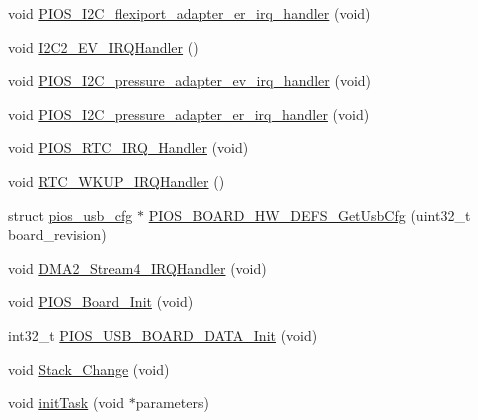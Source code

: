 \begin{DoxyCompactItemize}
\item 
void \hyperlink{group___revo_mini_ga7ae5d4453562364b12d1a9a55c2c9717}{\-P\-I\-O\-S\-\_\-\-I2\-C\-\_\-flexiport\-\_\-adapter\-\_\-er\-\_\-irq\-\_\-handler} (void)
\item 
void \hyperlink{group___revo_mini_gaa32a80208798d6132876a58823ff6202}{\-I2\-C2\-\_\-\-E\-V\-\_\-\-I\-R\-Q\-Handler} ()
\item 
void \hyperlink{group___revo_mini_ga7e50e4f3e62dd5e68d7d45ec01d1c367}{\-P\-I\-O\-S\-\_\-\-I2\-C\-\_\-pressure\-\_\-adapter\-\_\-ev\-\_\-irq\-\_\-handler} (void)
\item 
void \hyperlink{group___revo_mini_gac7417688efc77b991f77ec10f190e83e}{\-P\-I\-O\-S\-\_\-\-I2\-C\-\_\-pressure\-\_\-adapter\-\_\-er\-\_\-irq\-\_\-handler} (void)
\item 
void \hyperlink{group___revo_mini_gadc73bf2eccd9d9ff9d8efedd1e743704}{\-P\-I\-O\-S\-\_\-\-R\-T\-C\-\_\-\-I\-R\-Q\-\_\-\-Handler} (void)
\item 
void \hyperlink{group___revo_mini_ga7e78266985c97f3b7e8a9f91893657d1}{\-R\-T\-C\-\_\-\-W\-K\-U\-P\-\_\-\-I\-R\-Q\-Handler} ()
\item 
struct \hyperlink{structpios__usb__cfg}{pios\-\_\-usb\-\_\-cfg} $\ast$ \hyperlink{group___revo_mini_ga9075152ece4596f99329ba0bc3866dc9}{\-P\-I\-O\-S\-\_\-\-B\-O\-A\-R\-D\-\_\-\-H\-W\-\_\-\-D\-E\-F\-S\-\_\-\-Get\-Usb\-Cfg} (uint32\-\_\-t board\-\_\-revision)
\item 
void \hyperlink{group___revo_mini_ga295198ed574625d416158a5fc54205ea}{\-D\-M\-A2\-\_\-\-Stream4\-\_\-\-I\-R\-Q\-Handler} (void)
\item 
void \hyperlink{group___revo_mini_ga902009c5b1cb57d9f9d60092eb7cacfb}{\-P\-I\-O\-S\-\_\-\-Board\-\_\-\-Init} (void)
\item 
int32\-\_\-t \hyperlink{group___revo_mini_ga5efd94ab761f254827f38dba474cf642}{\-P\-I\-O\-S\-\_\-\-U\-S\-B\-\_\-\-B\-O\-A\-R\-D\-\_\-\-D\-A\-T\-A\-\_\-\-Init} (void)
\item 
void \hyperlink{group___revo_mini_ga7a789e7b91612099a4a1f355b9e97c24}{\-Stack\-\_\-\-Change} (void)
\item 
void \hyperlink{group___revo_mini_gae7ecc4ed0ea5858477b78acaf928c3ef}{init\-Task} (void $\ast$parameters)
\end{DoxyCompactItemize}
